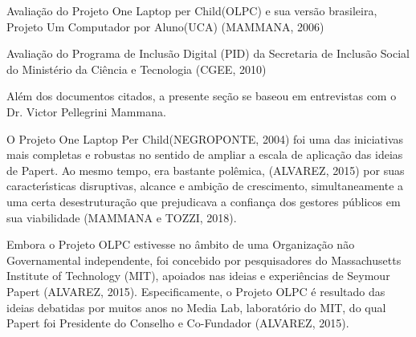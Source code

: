 \documentclass[
12pt,		%
openright,	%
twoside,  %
a4paper,			%
chapter=TITLE,		%
english,			%
french,				%
spanish,			%
brazil				%
]{USPSC-classe/USPSC}
\begin{document}
\begin{alineas}
\item Avalia\c{c}\~ao do Projeto \textquotedbl One Laptop per Child\textquotedbl  (OLPC) e sua vers\~ao brasileira, \textquotedbl Projeto Um Computador por Aluno\textquotedbl  (UCA) (MAMMANA, 2006)
\item Avalia\c{c}\~ao do Programa de Inclus\~ao Digital (PID) da Secretaria de Inclus\~ao Social do Minist\'erio da Ci\^encia e Tecnologia (CGEE, 2010)
\end{alineas}

Al\'em dos documentos citados, a presente se\c{c}\~ao se baseou em entrevistas com o Dr. Victor Pellegrini Mammana.

















O Projeto \textquotedbl One Laptop Per Child\textquotedbl  (NEGROPONTE, 2004) foi uma das iniciativas mais completas e robustas no sentido de ampliar a escala de aplica\c{c}\~ao das ideias de Papert. Ao mesmo tempo, era bastante pol\^emica, (ALVAREZ, 2015) por suas caracter\'{\i}sticas disruptivas, alcance e ambi\c{c}\~ao de crescimento, simultaneamente a uma certa desestrutura\c{c}\~ao que prejudicava a confian\c{c}a dos gestores p\'ublicos em sua viabilidade (MAMMANA e TOZZI, 2018).

















Embora o Projeto OLPC estivesse no \^ambito de uma Organiza\c{c}\~ao n\~ao Governamental independente,  foi concebido por pesquisadores do Massachusetts Institute of Technology (MIT), apoiados nas ideias e experi\^encias de Seymour Papert (ALVAREZ, 2015). Especificamente, o Projeto OLPC \'e resultado das ideias debatidas por muitos anos no Media Lab, laborat\'orio do MIT, do qual Papert foi Presidente do Conselho e Co-Fundador (ALVAREZ, 2015).
\end{document}
